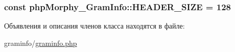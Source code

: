 \label{classphpMorphy__GramInfo_a2f3811aa2781d9827c551dae758228ad}
\hypertarget{classphpMorphy__GramInfo_a54ad8d949af9a1dd05a1d79fbff10a66}{
\subsubsection[{HEADER\_\-SIZE}]{\setlength{\rightskip}{0pt plus 5cm}const {\bf phpMorphy\_\-GramInfo::HEADER\_\-SIZE} = 128}}
\label{classphpMorphy__GramInfo_a54ad8d949af9a1dd05a1d79fbff10a66}


Объявления и описания членов класса находятся в файле:\begin{DoxyCompactItemize}
\item 
graminfo/\hyperlink{graminfo_8php}{graminfo.php}\end{DoxyCompactItemize}
